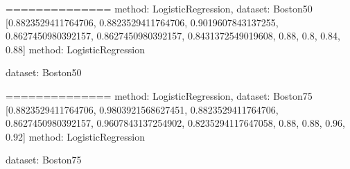 \documentclass{article}
\begin{document}
\begin{center}
\end{center}
==============
method: LogisticRegression, dataset: Boston50
[0.8823529411764706, 0.8823529411764706, 0.9019607843137255, 0.8627450980392157, 0.8627450980392157, 0.8431372549019608, 0.88, 0.8, 0.84, 0.88]
\newline
\newline
\noindent method: LogisticRegression
\newline
\newline

\noindent dataset: Boston50
\newline
\newline

\begin{center}
\end{center}
==============
method: LogisticRegression, dataset: Boston75
[0.8823529411764706, 0.9803921568627451, 0.8823529411764706, 0.8627450980392157, 0.9607843137254902, 0.8235294117647058, 0.88, 0.88, 0.96, 0.92]
\newline
\newline
\noindent method: LogisticRegression
\newline
\newline

\noindent dataset: Boston75
\newline
\newline
\end{document}
